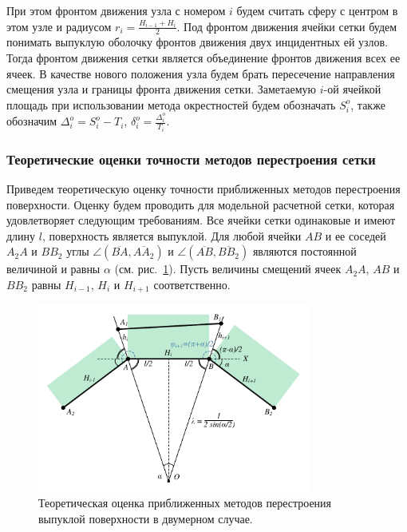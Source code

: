 При этом фронтом движения узла с номером $i$ будем считать сферу с центром в этом узле и радиусом $r_i = \frac{H_{i - 1} + H_i}{2}$.
Под фронтом движения ячейки сетки будем понимать выпуклую оболочку фронтов движения двух инцидентных ей узлов.
Тогда фронтом движения сетки является объединение фронтов движения всех ее ячеек.
В качестве нового положения узла будем брать пересечение направления смещения узла и границы фронта движения сетки.
Заметаемую $i$-ой ячейкой площадь при использовании метода окрестностей будем обозначать $S_i^o$, также обозначим $\Delta_i^o = S_i^o - T_i$, $\delta_i^o = \frac{\Delta_i^o}{T_i}$.

\subsubsection{Теоретические оценки точности методов перестроения сетки}

Приведем теоретическую оценку точности приближенных методов перестроения поверхности.
Оценку будем проводить для модельной расчетной сетки, которая удовлетворяет следующим требованиям.
Все ячейки сетки одинаковые и имеют длину $l$, поверхность является выпуклой.
Для любой ячейки $AB$ и ее соседей $A_2A$ и $BB_2$ углы $\angle (\overline{BA}, \overline{AA_2})$ и $\angle (\overline{AB}, \overline{BB_2})$ являются постоянной величиной и равны $\alpha$ (см. рис.~\ref{fig:text_1_remesh_2d_theoretical}).
Пусть величины смещений ячеек $A_2A$, $AB$ и $BB_2$ равны $H_{i - 1}$, $H_i$ и $H_{i + 1}$ соответственно.

\begin{figure}[ht]
\centering
\includegraphics[width=0.8\textwidth]{pics/text_1_remesh_2d/theoretical.pdf}
\singlespacing
{}\caption{Теоретическая оценка приближенных методов перестроения выпуклой поверхности в двумерном случае.}
\label{fig:text_1_remesh_2d_theoretical}
\end{figure}


